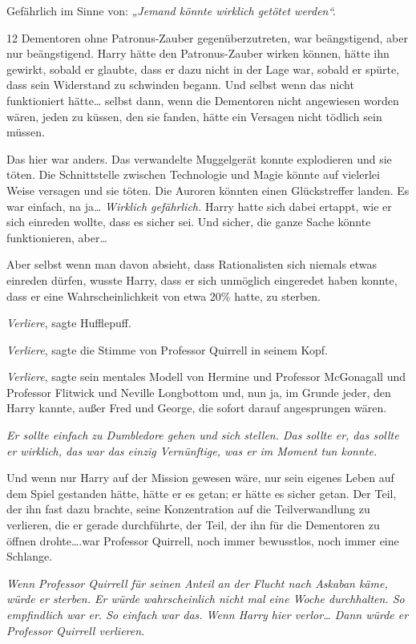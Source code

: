 {Gefährlich im Sinne von: \emph{„Jemand könnte wirklich getötet werden“.}

12 Dementoren ohne Patronus-Zauber gegenüberzutreten, war beängstigend, aber nur beängstigend. Harry hätte den Patronus-Zauber wirken können, hätte ihn gewirkt, sobald er glaubte, dass er dazu nicht in der Lage war, sobald er spürte, dass sein Widerstand zu schwinden begann. Und selbst wenn das nicht funktioniert hätte… selbst dann, wenn die Dementoren nicht angewiesen worden wären, jeden zu küssen, den sie fanden, hätte ein Versagen nicht tödlich sein müssen.

Das hier war anders. Das verwandelte Muggelgerät konnte explodieren und sie töten. Die Schnittstelle zwischen Technologie und Magie könnte auf vielerlei Weise versagen und sie töten. Die Auroren könnten einen Glückstreffer landen. Es war einfach, na ja… \emph{Wirklich gefährlich.} Harry hatte sich dabei ertappt, wie er sich einreden wollte, dass es sicher sei. Und sicher, die ganze Sache könnte funktionieren, aber…

Aber selbst wenn man davon absieht, dass Rationalisten sich niemals etwas einreden dürfen, wusste Harry, dass er sich unmöglich eingeredet haben konnte, dass er eine Wahrscheinlichkeit von etwa 20\% hatte, zu sterben.

\emph{Verliere}, sagte Hufflepuff.

\emph{Verliere}, sagte die Stimme von Professor Quirrell in seinem Kopf.

\emph{Verliere}, sagte sein mentales Modell von Hermine und Professor McGonagall und Professor Flitwick und Neville Longbottom und, nun ja, im Grunde jeder, den Harry kannte, außer Fred und George, die sofort darauf angesprungen wären.

\emph{Er sollte einfach zu Dumbledore gehen und sich stellen. Das sollte er, das sollte er wirklich, das war das einzig Vernünftige, was er im Moment tun konnte.}

Und wenn nur Harry auf der Mission gewesen wäre, nur sein eigenes Leben auf dem Spiel gestanden hätte, hätte er es getan; er hätte es sicher getan. Der Teil, der ihn fast dazu brachte, seine Konzentration auf die Teilverwandlung zu verlieren, die er gerade durchführte, der Teil, der ihn für die Dementoren zu öffnen drohte….war Professor Quirrell, noch immer bewusstlos, noch immer eine Schlange.

\emph{Wenn Professor Quirrell für seinen Anteil an der Flucht nach Askaban käme, würde er sterben. Er würde wahrscheinlich nicht mal eine Woche durchhalten. So empfindlich war er. So einfach war das. Wenn Harry hier verlor… Dann würde er Professor Quirrell verlieren.}

}
